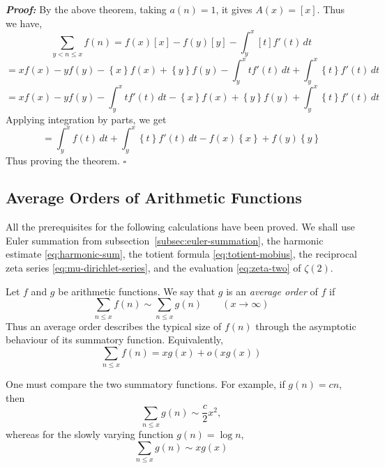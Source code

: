 \documentclass[a4paper,11pt,abstracton]{scrartcl}
\theoremstyle{dotlessP}
\theoremstyle{dotlessS}
\theoremstyle{remark}
\theoremstyle{definition}
\begin{document}
\begin{claim_box}
\textbf{\textit{Proof:}}
By the above theorem, taking $a(n)=1$, it gives $A(x)=[x]$. Thus we have,
$$\sum_{y < n \le x} f(n) = f(x)[x]-f(y)[y]-\int_{y}^{x}[t]f'(t)\,dt$$
$$=xf(x)-yf(y)-\left\{x\right\}f(x)+\left\{y\right\}f(y)-\int_y^x tf'(t)\,dt+\int_y^x \left\{t\right\}f'(t)\,dt$$
$$=xf(x)-yf(y)-\int_y^x tf'(t)\,dt-\left\{x\right\}f(x)+\left\{y\right\}f(y)+\int_y^x \left\{t\right\}f'(t)\,dt$$
Applying integration by parts, we get
$$      =\int_y^x f(t)\,dt
       +\int_y^x \left\{t\right\}f'(t)\,dt
       -f(x)\left\{x\right\}+f(y)\left\{y\right\}$$
       Thus proving the theorem.
\hfill$\square$
\end{claim_box}

\subsection{Average Orders of Arithmetic Functions}

All the prerequisites for the following calculations have been
proved. We shall use Euler summation from
subsection~\ref{subsec:euler-summation}, the harmonic estimate
\eqref{eq:harmonic-sum}, the totient formula
\eqref{eq:totient-mobius}, the reciprocal zeta series
\eqref{eq:mu-dirichlet-series}, and the evaluation
\eqref{eq:zeta-two} of $\zeta(2)$.

\begin{definition_box}
Let $f$ and $g$ be arithmetic functions. We say that $g$ is an
\emph{average order} of $f$ if
\[
    \sum_{n\leq x}f(n)
      \sim\sum_{n\leq x}g(n)
      \qquad(x\to\infty)
\]
Thus an average order describes the typical size of $f(n)$ through
the asymptotic behaviour of its summatory function. Equivalently, 
$$\sum_{n\leq x}f(n)=xg(x)+o(xg(x))$$
\end{definition_box}

\begin{remark_box}
One must compare the two summatory functions. For example, if
$g(n)=cn$, then
\[
    \sum_{n\leq x}g(n)\sim\frac{c}{2}x^2,
\]
whereas for the slowly varying function $g(n)=\log n$,
\[
    \sum_{n\leq x}g(n)\sim xg(x)
\]
\end{remark_box}
\end{document}
